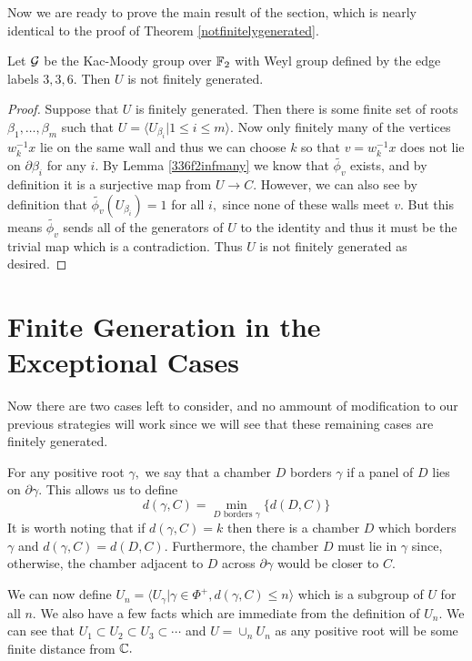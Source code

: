\documentclass[class=book, crop=false]{standalone}
\begin{document}
Now we are ready to prove the main result of the section, which is nearly identical to the proof of Theorem \ref{notfinitelygenerated}.
\begin{theorem}
	\label{336f2notfg}
	Let $\mathcal{G}$ be the Kac-Moody group over $\mathbb{F}_{2}$ with Weyl group defined by the edge labels $3,3,6.$ Then $U$ is not finitely generated.
\end{theorem}
\begin{proof}
	Suppose that $U$ is finitely generated. Then there is some finite set of roots $\beta_1,\dots,\beta_m$ such that $U=\langle U_{\beta_i}|1\le i\le m\rangle.$ Now only finitely many of the vertices $w_k^{-1}x$ lie on the same wall and thus we can choose $k$ so that $v=w_k^{-1}x$ does not lie on $\partial \beta_i$ for any $i.$ By Lemma \ref{336f2infmany} we know that $\tilde{\phi_v}$ exists, and by definition it is a surjective map from $U\to C.$ However, we can also see by definition that $\tilde{\phi_v}(U_{\beta_i})=1$ for all $i,$ since none of these walls meet $v.$ But this means $\tilde{\phi_v}$ sends all of the generators of $U$ to the identity and thus it must be the trivial map which is a contradiction. Thus $U$ is not finitely generated as desired.
\end{proof}

\section{Finite Generation in the Exceptional Cases}
Now there are two cases left to consider, and no ammount of modification to our previous strategies will work since we will see that these remaining cases are finitely generated. 

For any positive root $\gamma,$ we say that a chamber $D$ borders $\gamma$ if a panel of $D$ lies on $\partial \gamma.$ This allows us to define
\[
	d(\gamma,C)=\min_{D\text{ borders }\gamma} \{d(D,C)\}
\]
It is worth noting that if $d(\gamma,C)=k$ then there is a chamber $D$ which borders $\gamma$ and $d(\gamma,C)=d(D,C).$ Furthermore, the chamber $D$ must lie in $\gamma$ since, otherwise, the chamber adjacent to $D$ across $\partial\gamma$ would be closer to $C.$

We can now define $U_n=\langle U_{\gamma}|\gamma\in \Phi^+, d(\gamma,C)\le n\rangle$ which is a subgroup of $U$ for all $n.$ We also have a few facts which are immediate from the definition of $U_n.$ We can see that $U_1\subset U_2\subset U_3\subset \cdots$ and $U=\cup_{n}U_n$ as any positive root will be some finite distance from $\mathbb{C}.$ 
\end{document}
